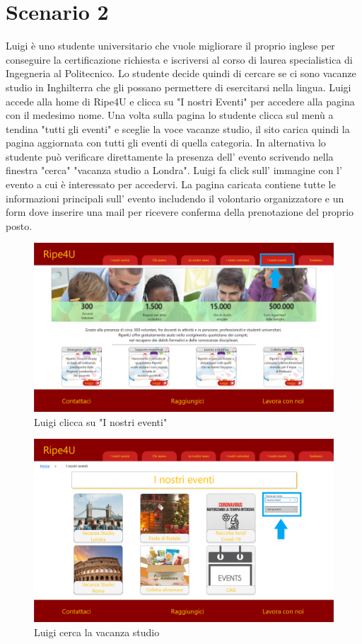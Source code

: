     \section{Scenario 2}
    Luigi è uno studente universitario che vuole migliorare il proprio inglese
    per conseguire la certificazione richiesta e iscriversi al corso di laurea
    specialistica di Ingegneria al Politecnico. Lo studente decide quindi di cercare
    se ci sono vacanze studio in Inghilterra che gli possano permettere di
    esercitarsi nella lingua. Luigi accede alla home di Ripe4U e clicca su "I nostri
    Eventi" per accedere alla pagina con il medesimo nome. Una volta sulla pagina lo
    studente clicca sul menù a tendina "tutti gli eventi" e sceglie la voce
    vacanze studio, il sito carica quindi la pagina aggiornata con tutti gli
    eventi di quella categoria. In alternativa lo studente può
    verificare direttamente la presenza dell' evento scrivendo nella finestra
    "cerca" "vacanza studio a Londra". Luigi fa click sull' immagine con l'
    evento a cui è interessato per accedervi. La pagina caricata contiene tutte le
    informazioni principali sull' evento includendo il volontario organizzatore e un
    form dove inserire una mail per ricevere conferma della prenotazione del proprio
    posto.
    \begin{figure}[H]
        \centering
        \includegraphics[scale=0.3]{resources/images/scenario2-1.png}
        \caption{Luigi clicca su "I nostri eventi"}
    \end{figure}
    \begin{figure}[H]
        \centering
        \includegraphics[scale=0.3]{resources/images/scenario2-2.png}
        \caption{Luigi cerca la vacanza studio}
    \end{figure}
